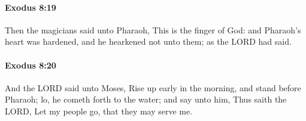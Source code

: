 		\paragraph{Exodus 8:19} %
			\label{EXODUS-8-19}

			Then the magicians said unto Pharaoh, This is the finger of God: and Pharaoh's heart was hardened, and he hearkened not unto them; as the LORD had said.


		\paragraph{Exodus 8:20} %
			\label{EXODUS-8-20}

			And the LORD said unto Moses, Rise up early in the morning, and stand before Pharaoh; lo, he cometh forth to the water; and say unto him, Thus saith the LORD, Let my people go, that they may serve me.


